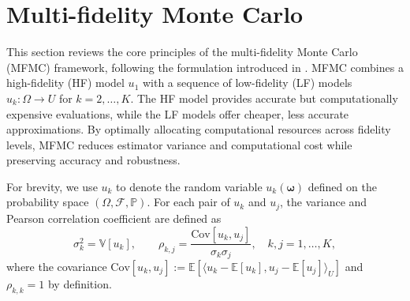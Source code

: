 \section{Multi-fidelity Monte Carlo}\label{sec:MFMC}
This section reviews the core principles of the multi-fidelity Monte Carlo (MFMC) framework, following the formulation introduced in \cite{PeWiGu:2016}. MFMC combines a high-fidelity (HF) model $u_{1}$ with a sequence of low-fidelity (LF) models $u_{k}:\Omega \rightarrow U$ for $k=2,\ldots,K$. The HF model provides accurate but computationally expensive evaluations, while the LF models offer cheaper, less accurate approximations. By optimally allocating computational resources across fidelity levels, MFMC reduces estimator variance and computational cost while preserving accuracy and robustness.

For brevity, we use $u_k$ to denote the random variable $u_k(\boldsymbol{\omega})$ defined on the probability space $(\Omega,\mathcal{F},\mathbb{P})$. For each pair of $u_{k}$ and $u_{j}$, the variance and Pearson correlation coefficient are defined as
%
\begin{equation*}
    \sigma_k^2 = \mathbb{V}\!\left[u_k\right],\qquad 
    \rho_{k,j} = \frac{\text{Cov}\!\left[u_k,u_j\right]}{\sigma_k\sigma_j}, 
    \quad k,j=1,\dots,K,
\end{equation*}
%
where the covariance $\text{Cov}[u_k,u_j] := \mathbb{E}[\langle u_k - \mathbb{E}[u_k], u_j - \mathbb{E}[u_j]\rangle_U]$ and $\rho_{k,k}=1$ by definition.


